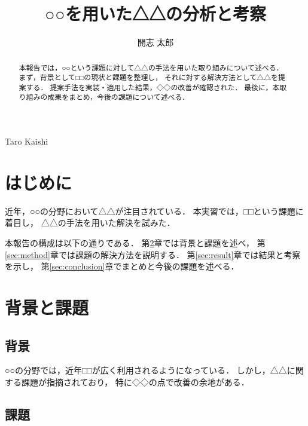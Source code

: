 \documentclass[submit,techrep,noauthor]{ipsj}
\begin{document}
\title{○○を用いた△△の分析と考察}

\author{開志 太郎}{Taro Kaishi}{}

\begin{abstract}
本報告では，○○という課題に対して△△の手法を用いた取り組みについて述べる．
まず，背景として□□の現状と課題を整理し，
それに対する解決方法として△△を提案する．
提案手法を実装・適用した結果，◇◇の改善が確認された．
最後に，本取り組みの成果をまとめ，今後の課題について述べる．
\end{abstract}

\maketitle

\section{はじめに}

近年，○○の分野において△△が注目されている．
本実習では，□□という課題に着目し，
△△の手法を用いた解決を試みた．

本報告の構成は以下の通りである．
第\ref{sec:background}章では背景と課題を述べ，
第\ref{sec:method}章では課題の解決方法を説明する．
第\ref{sec:result}章では結果と考察を示し，
第\ref{sec:conclusion}章でまとめと今後の課題を述べる．

\section{背景と課題}
\label{sec:background}


\subsection{背景}

○○の分野では，近年□□が広く利用されるようになっている\cite{okumura}．
しかし，△△に関する課題が指摘されており，
特に◇◇の点で改善の余地がある．

\subsection{課題}
\end{document}
